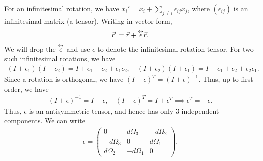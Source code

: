 For an infinitesimal rotation, we have $x_{i}' = x_{i} + \sum_{j \neq i}\epsilon_{ij} x_{j}$, where $(\epsilon_{ij})$ is an infinitesimal matrix (a tensor). Writing in vector form,
\begin{align}
    \vec{r}' = \vec{r} + \overset{\leftrightarrow}{\epsilon} \vec{r}.
\end{align}
We will drop the $\overset{\leftrightarrow}{\epsilon}$ and use $\epsilon$ to denote the infinitesimal rotation tensor. For two such infinitesimal rotations, we have
\begin{align}
    (I+\epsilon_{1})(I+\epsilon_{2}) = I + \epsilon_{1} + \epsilon_{2} + \epsilon_{1}\epsilon_{2}, \quad (I+\epsilon_{2})(I+\epsilon_{1}) = I + \epsilon_{1} + \epsilon_{2} + \epsilon_{2}\epsilon_{1}.
\end{align}
Since a rotation is orthogonal, we have $(I+\epsilon)^{T} = (I+\epsilon)^{-1}$. Thus, up to first order, we have
\begin{align}
    (I+\epsilon)^{-1} = I - \epsilon, \quad (I+\epsilon)^{T} = I + \epsilon^{T} \implies \epsilon^{T} = -\epsilon.
\end{align}
Thus, $\epsilon$ is an antisymmetric tensor, and hence has only 3 independent components. We can write
\begin{align}
    \epsilon = \begin{pmatrix}
        0 & d\Omega_{3} & -d\Omega_{2} \\
        -d\Omega_{3} & 0 & d\Omega_{1} \\
        d\Omega_{2} & -d\Omega_{1} & 0
    \end{pmatrix}.
\end{align}

